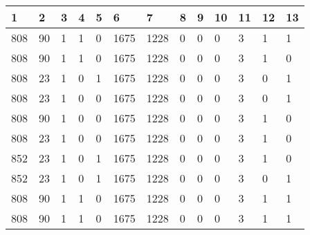 \begin{table}[H]
\begin{tabular}{|l|l|l|l|l|l|l|l|l|l|l|l|l|}
\hline
\textbf{1} & \textbf{2} & \textbf{3} & \textbf{4} & \textbf{5} & \textbf{6} & \textbf{7} & \textbf{8} & \textbf{9} & \textbf{10} & \textbf{11} & \textbf{12} & \textbf{13} \\ \hline
808  &  90  &  1  &  1  &  0  &  1675  &  1228  &  0  &  0  &  0  &  3  &  1  &  1 \\ \hline
808  &  90  &  1  &  1  &  0  &  1675  &  1228  &  0  &  0  &  0  &  3  &  1  &  0 \\ \hline
808  &  23  &  1  &  0  &  1  &  1675  &  1228  &  0  &  0  &  0  &  3  &  0  &  1 \\ \hline
808  &  23  &  1  &  0  &  0  &  1675  &  1228  &  0  &  0  &  0  &  3  &  0  &  1 \\ \hline
808  &  90  &  1  &  0  &  0  &  1675  &  1228  &  0  &  0  &  0  &  3  &  1  &  0 \\ \hline
808  &  23  &  1  &  0  &  0  &  1675  &  1228  &  0  &  0  &  0  &  3  &  1  &  0 \\ \hline
852  &  23  &  1  &  0  &  1  &  1675  &  1228  &  0  &  0  &  0  &  3  &  1  &  0 \\ \hline
852  &  23  &  1  &  0  &  1  &  1675  &  1228  &  0  &  0  &  0  &  3  &  0  &  1 \\ \hline
808  &  90  &  1  &  1  &  0  &  1675  &  1228  &  0  &  0  &  0  &  3  &  1  &  1 \\ \hline
808  &  90  &  1  &  1  &  0  &  1675  &  1228  &  0  &  0  &  0  &  3  &  1  &  1 \\ \hline
\end{tabular}
\end{table}

